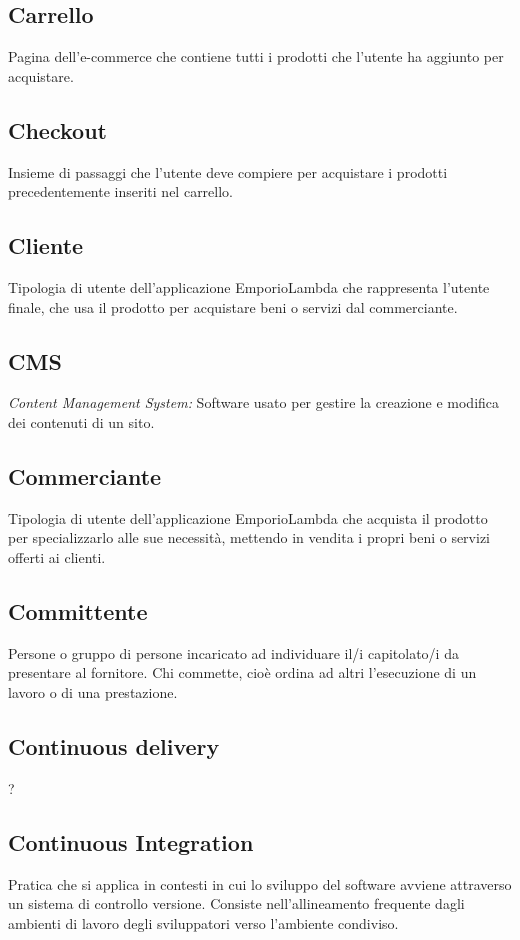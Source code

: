 \subsection*{Carrello}
Pagina dell'e-commerce che contiene tutti i prodotti che l'utente ha aggiunto per acquistare.

\subsection*{Checkout}
Insieme di passaggi che l'utente deve compiere per acquistare i prodotti precedentemente inseriti nel carrello.

\subsection*{Cliente}
Tipologia di utente dell'applicazione EmporioLambda che rappresenta l'utente finale, che usa
il prodotto per acquistare beni o servizi dal commerciante.

\subsection*{CMS}
\textit{Content Management System:} Software usato per gestire la creazione e modifica dei contenuti di un sito.

\subsection*{Commerciante}
Tipologia di utente dell'applicazione EmporioLambda che acquista il prodotto per specializzarlo
alle sue necessità, mettendo in vendita i propri beni o servizi offerti ai clienti.

\subsection*{Committente}
Persone o gruppo di persone incaricato ad individuare il/i capitolato/i da presentare al fornitore.
Chi commette, cioè ordina ad altri l'esecuzione di un lavoro o di una prestazione.

\subsection*{Continuous delivery}
?

\subsection*{Continuous Integration}
Pratica che si applica in contesti in cui lo sviluppo del software avviene attraverso un sistema di controllo versione. Consiste nell'allineamento frequente dagli ambienti di lavoro degli sviluppatori verso l'ambiente condiviso.

